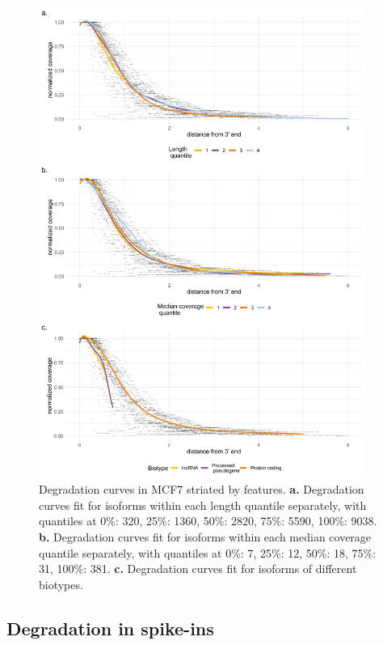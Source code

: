 \begin{figure}[H]
    \centering
    \includegraphics[width=0.95\textwidth]{figures/sec-2-by-feature.png}
    \caption[Degradation curves in MCF7 striated by features]{Degradation curves in MCF7 striated by features. \textbf{a.} Degradation curves fit for isoforms within each length quantile separately, with quantiles at 0\%: 320, 25\%: 1360, 50\%: 2820, 75\%: 5590, 100\%: 9038. \textbf{b.} Degradation curves fit for isoforms within each median coverage quantile separately, with quantiles at 0\%: 7, 25\%: 12, 50\%: 18, 75\%: 31, 100\%: 381. \textbf{c.} Degradation curves fit for isoforms of different biotypes.}
    \label{fig:cov-feature}
\end{figure}

\subsection{Degradation in spike-ins}

